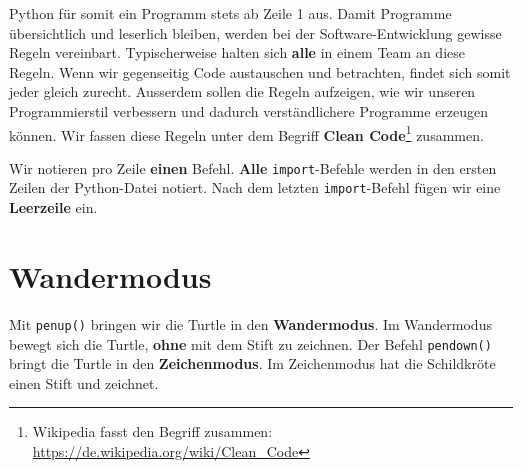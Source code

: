 Python für somit ein Programm stets ab Zeile 1 aus. Damit Programme übersichtlich und leserlich bleiben, werden bei der Software-Entwicklung gewisse Regeln vereinbart. Typischerweise halten sich \textbf{alle} in einem Team an diese Regeln. Wenn wir gegenseitig Code austauschen und betrachten, findet sich somit jeder gleich zurecht. Ausserdem sollen die Regeln aufzeigen, wie wir unseren Programmierstil verbessern und dadurch verständlichere Programme erzeugen können. Wir fassen diese Regeln unter dem Begriff \textbf{Clean Code}\footnote{Wikipedia fasst den Begriff  zusammen: \url{https://de.wikipedia.org/wiki/Clean_Code}} zusammen.

\begin{cleancode}
Wir notieren pro Zeile \textbf{einen} Befehl. \textbf{Alle} \lstinline{import}-Befehle werden in den ersten Zeilen der Python-Datei notiert. Nach dem letzten \lstinline{import}-Befehl fügen wir eine \textbf{Leerzeile} ein.
\end{cleancode}

\section{Wandermodus}

Mit \lstinline{penup()} bringen wir die Turtle in den \textbf{Wandermodus}. Im Wandermodus bewegt sich die Turtle, \textbf{ohne} mit dem Stift zu zeichnen. Der Befehl \lstinline{pendown()} bringt die Turtle in den \textbf{Zeichenmodus}. Im Zeichenmodus hat die Schildkröte einen Stift und zeichnet.

